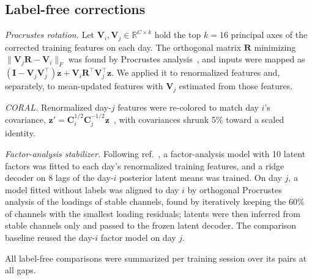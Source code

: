 \documentclass{iopjournal}
\begin{document}
\subsection{Label-free corrections}

\textit{Procrustes rotation.} Let $\mathbf{V}_i, \mathbf{V}_j \in \mathbb{R}^{C\times k}$ hold the top $k = 16$ principal
axes of the corrected training features on each day. The orthogonal matrix $\mathbf{R}$ minimizing
$\|\mathbf{V}_j\mathbf{R} - \mathbf{V}_i\|_F$ was found by Procrustes analysis~\cite{schonemann1966}, and inputs were mapped
as $(\mathbf{I} - \mathbf{V}_j\mathbf{V}_j^\top)\mathbf{z} + \mathbf{V}_i\mathbf{R}^\top\mathbf{V}_j^\top\mathbf{z}$. We
applied it to renormalized features and, separately, to mean-updated features with $\mathbf{V}_j$ estimated from those
features.

\textit{CORAL.} Renormalized day-$j$ features were re-colored to match day $i$'s covariance,
$\mathbf{z}' = \mathbf{C}_i^{1/2}\mathbf{C}_j^{-1/2}\mathbf{z}$~\cite{sun2016}, with covariances shrunk 5\% toward a scaled
identity.

\textit{Factor-analysis stabilizer.} Following ref.~\cite{degenhart2020}, a factor-analysis model with 10 latent factors
was fitted to each day's renormalized training features, and a ridge decoder on 8 lags of the day-$i$ posterior latent
means was trained. On day $j$, a model fitted without labels was aligned to day $i$ by orthogonal Procrustes analysis of
the loadings of stable channels, found by iteratively keeping the 60\% of channels with the smallest loading residuals;
latents were then inferred from stable channels only and passed to the frozen latent decoder. The comparison baseline
reused the day-$i$ factor model on day $j$.

All label-free comparisons were summarized per training session over its pairs at all gaps.
\end{document}
